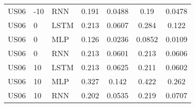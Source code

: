 \begin{table*}[htbp]
\begin{tabular}{lllcccc}
US06 & -10 & RNN & 0.191 & 0.0488 & 0.19 & 0.0478 \\
US06 & 0 & LSTM & 0.213 & 0.0607 & 0.284 & 0.122 \\
US06 & 0 & MLP & 0.126 & 0.0236 & 0.0852 & 0.0109 \\
US06 & 0 & RNN & 0.213 & 0.0601 & 0.213 & 0.0606 \\
US06 & 10 & LSTM & 0.213 & 0.0625 & 0.211 & 0.0602 \\
US06 & 10 & MLP & 0.327 & 0.142 & 0.422 & 0.262 \\
US06 & 10 & RNN & 0.202 & 0.0535 & 0.219 & 0.0707 \\
\bottomrule
\end{tabular}
\end{table*}
